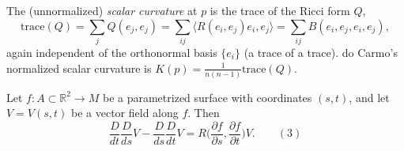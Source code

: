 \begin{definition}
  \label{def:dc-ch4-4-scalar}


  The (unnormalized) \emph{scalar curvature} at $p$ is the trace of the Ricci
  form $Q$,
  $$
  \mathrm{trace}(Q)=\sum_j Q(e_j,e_j)=\sum_{ij}\langle R(e_i,e_j)e_i,e_j\rangle
    =\sum_{ij}B(e_i,e_j,e_i,e_j),
  $$
  again independent of the orthonormal basis $\{e_i\}$ (a trace of a trace). do
  Carmo's normalized scalar curvature is $K(p)=\frac{1}{n(n-1)}\mathrm{trace}(Q)$.
\end{definition}

\begin{lemma}
  \label{lem:dc-ch4-4-1}


  Let $f:A\subset\mathbb{R}^2\to M$ be a parametrized surface with coordinates
  $(s,t)$, and let $V=V(s,t)$ be a vector field along $f$. Then
  $$
  \frac{D}{dt}\frac{D}{ds}V-\frac{D}{ds}\frac{D}{dt}V=R\Big(\frac{\partial f}{\partial s},\frac{\partial f}{\partial t}\Big)V.\qquad(3)
  $$
\end{lemma}
